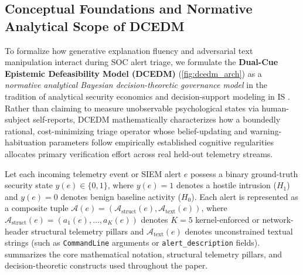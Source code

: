 \documentclass[11pt,a4paper]{article}
\let\oldtexttt\texttt
\renewcommand{\texttt}[1]{\textnormal{\oldtexttt{#1}}}
\begin{document}
\subsection{Conceptual Foundations and Normative Analytical Scope of DCEDM}
\label{subsec:dcedm_foundations}

To formalize how generative explanation fluency and adversarial text manipulation interact during SOC alert triage, we formulate the \textbf{Dual-Cue Epistemic Defeasibility Model (DCEDM)} (\cref{fig:dcedm_arch}) as a \textit{normative analytical Bayesian decision-theoretic governance model} in the tradition of analytical security economics and decision-support modeling in IS \citep{liu2020centralized, li2021roles, revilla2023human}. Rather than claiming to measure unobservable psychological states via human-subject self-reports, DCEDM mathematically characterizes how a boundedly rational, cost-minimizing triage operator whose belief-updating and warning-habituation parameters follow empirically established cognitive regularities \citep{alter2009uniting, anderson2016warning, vance2018fog, vasconcelos2023explanations, bucinca2021trust} allocates primary verification effort across real held-out telemetry streams.

Let each incoming telemetry event or SIEM alert $e$ possess a binary ground-truth security state $y(e) \in \{0, 1\}$, where $y(e) = 1$ denotes a hostile intrusion ($H_1$) and $y(e) = 0$ denotes benign baseline activity ($H_0$). Each alert is represented as a composite tuple $\mathcal{A}(e) = (\mathcal{A}_{\text{struct}}(e), \mathcal{A}_{\text{text}}(e))$, where $\mathcal{A}_{\text{struct}}(e) = (a_1(e), \dots, a_K(e))$ denotes $K = 5$ kernel-enforced or network-header structural telemetry pillars and $\mathcal{A}_{\text{text}}(e)$ denotes unconstrained textual strings (such as \texttt{CommandLine} arguments or \texttt{alert\_description} fields).  summarizes the core mathematical notation, structural telemetry pillars, and decision-theoretic constructs used throughout the paper.
\end{document}
